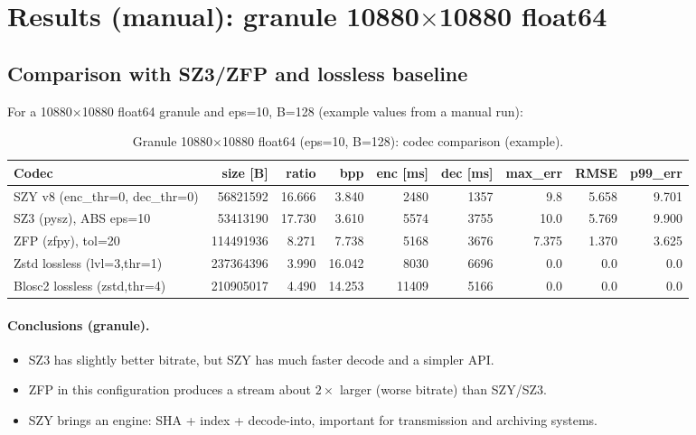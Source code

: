 \documentclass[11pt,a4paper]{article}
\begin{document}
\section{Results (manual): granule 10880$\times$10880 float64}

\subsection{Comparison with SZ3/ZFP and lossless baseline}
For a 10880$\times$10880 float64 granule and eps=10, B=128 (example values from a manual run):

\begin{table}[H]
\centering
\caption{Granule 10880$\times$10880 float64 (eps=10, B=128): codec comparison (example).}
\begin{adjustbox}{max width=\textwidth}
\begin{tabular}{@{}lrrrrrrrr@{}}
\toprule
Codec & size [B] & ratio & bpp & enc [ms] & dec [ms] & max\_err & RMSE & p99\_err \\
\midrule
SZY v8 (enc\_thr=0, dec\_thr=0) & 56821592 & 16.666 & 3.840 & 2480 & 1357 & 9.8 & 5.658 & 9.701 \\
SZ3 (pysz), ABS eps=10         & 53413190 & 17.730 & 3.610 & 5574 & 3755 & 10.0 & 5.769 & 9.900 \\
ZFP (zfpy), tol=20             &114491936 &  8.271 & 7.738 & 5168 & 3676 & 7.375 & 1.370 & 3.625 \\
Zstd lossless (lvl=3,thr=1)    &237364396 &  3.990 &16.042 & 8030 & 6696 & 0.0 & 0.0 & 0.0 \\
Blosc2 lossless (zstd,thr=4)   &210905017 &  4.490 &14.253 &11409 & 5166 & 0.0 & 0.0 & 0.0 \\
\bottomrule
\end{tabular}
\end{adjustbox}
\end{table}

\paragraph{Conclusions (granule).}
\begin{itemize}
  \item SZ3 has slightly better bitrate, but SZY has much faster decode and a simpler API.
  \item ZFP in this configuration produces a stream about $2\times$ larger (worse bitrate) than SZY/SZ3.
  \item SZY brings an engine: SHA + index + decode-into, important for transmission and archiving systems.
\end{itemize}
\end{document}
